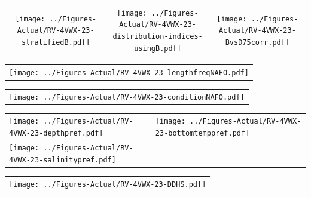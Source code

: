 \documentclass[12pt]{article}\usepackage[]{graphicx}\usepackage[]{color}
\begin{document}
\vspace{1cm}
\begin{minipage}{1.0\textwidth}
 \begin{tabular}{ccc}
\texttt{[image: ../Figures-Actual/RV-4VWX-23-stratifiedB.pdf]} & 
\texttt{[image: ../Figures-Actual/RV-4VWX-23-distribution-indices-usingB.pdf]} & 
\texttt{[image: ../Figures-Actual/RV-4VWX-23-BvsD75corr.pdf]} \\ 
\end{tabular} 
\end{minipage}
\clearpage
\begin{minipage}{1.0\textwidth}
 \begin{tabular}{c}
\texttt{[image: ../Figures-Actual/RV-4VWX-23-lengthfreqNAFO.pdf]} \\ 
\end{tabular} 
\end{minipage}
\newline

\vspace{1cm}
\begin{minipage}{1.0\textwidth}
 \begin{tabular}{c}
\texttt{[image: ../Figures-Actual/RV-4VWX-23-conditionNAFO.pdf]} \\ 
\end{tabular} 
\end{minipage}
\clearpage
\begin{minipage}{1.0\textwidth}
 \begin{tabular}[t]{m{3in}m{3in}}
\texttt{[image: ../Figures-Actual/RV-4VWX-23-depthpref.pdf]} & 
\texttt{[image: ../Figures-Actual/RV-4VWX-23-bottomtemppref.pdf]} \\ 
\texttt{[image: ../Figures-Actual/RV-4VWX-23-salinitypref.pdf]} & 
 \\ 
\end{tabular} 
\end{minipage}
\newline

\vspace{1cm}
\begin{minipage}{1.0\textwidth}
 \begin{tabular}{c}
\texttt{[image: ../Figures-Actual/RV-4VWX-23-DDHS.pdf]} \\ 
\end{tabular} 
\end{minipage}
\clearpage
\end{document}
